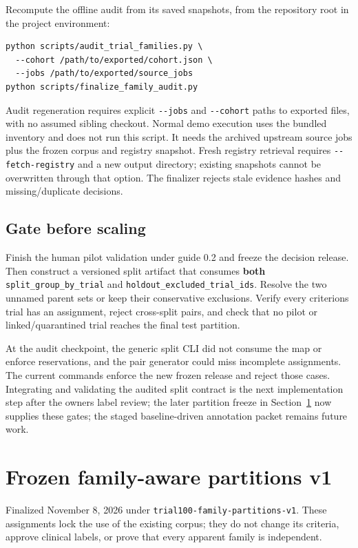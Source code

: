 \documentclass[10pt,letterpaper]{article}
\newcommand{\pathcode}[1]{\nolinkurl{#1}}
\begin{document}
Recompute the offline audit from its saved snapshots, from the repository root in the project environment:

\begin{Verbatim}[breaklines=true,fontsize=\small]
python scripts/audit_trial_families.py \
  --cohort /path/to/exported/cohort.json \
  --jobs /path/to/exported/source_jobs
python scripts/finalize_family_audit.py
\end{Verbatim}

Audit regeneration requires explicit \pathcode{--jobs} and \pathcode{--cohort} paths to exported files, with no assumed sibling checkout. Normal demo execution uses the bundled inventory and does not run this script. It needs the archived upstream source jobs plus the frozen corpus and registry snapshot. Fresh registry retrieval requires \pathcode{--fetch-registry} and a new output directory; existing snapshots cannot be overwritten through that option. The finalizer rejects stale evidence hashes and missing/duplicate decisions.

\subsection{Gate before scaling}\label{audit-gate-before-scaling}

Finish the human pilot validation under guide 0.2 and freeze the decision release. Then construct a versioned split artifact that consumes \textbf{both} \pathcode{split_group_by_trial} and \pathcode{holdout_excluded_trial_ids}. Resolve the two unnamed parent sets or keep their conservative exclusions. Verify every criterion\textquotesingle s trial has an assignment, reject cross-split pairs, and check that no pilot or linked/quarantined trial reaches the final test partition.

At the audit checkpoint, the generic split CLI did not consume the map or
enforce reservations, and the pair generator could miss incomplete assignments.
The current commands enforce the new frozen release and reject those cases. Integrating and validating the audited split contract is the next implementation step after the owner\textquotesingle s label review; the later partition freeze in Section~\ref{sec:partitionrelease} now supplies
these gates; the staged baseline-driven annotation packet remains future work.

\clearpage
\section{Frozen family-aware partitions v1}\label{sec:partitionrelease}
Finalized November 8, 2026 under \pathcode{trial100-family-partitions-v1}.
These assignments lock the use of the existing corpus; they do not change its
criteria, approve clinical labels, or prove that every apparent family is independent.
\end{document}
